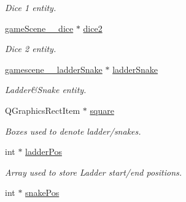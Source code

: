 \begin{DoxyCompactItemize}
\begin{DoxyCompactList}\small\item\em Dice 1 entity. \end{DoxyCompactList}\item 
\hypertarget{classgameScene__1_aa7c9887f53fd8309078247e57222459e}{\hyperlink{classgameScene__1__dice}{game\-Scene\-\_\-\_\-dice} $\ast$ \hyperlink{classgameScene__1_aa7c9887f53fd8309078247e57222459e}{dice2}}\label{classgameScene__1_aa7c9887f53fd8309078247e57222459e}

\begin{DoxyCompactList}\small\item\em Dice 2 entity. \end{DoxyCompactList}\item 
\hypertarget{classgameScene__1_a54c052f8c73d437ed4912ff28d8671aa}{\hyperlink{classgamescene__1__ladderSnake}{gamescene\-\_\-\_\-ladder\-Snake} $\ast$ \hyperlink{classgameScene__1_a54c052f8c73d437ed4912ff28d8671aa}{ladder\-Snake}}\label{classgameScene__1_a54c052f8c73d437ed4912ff28d8671aa}

\begin{DoxyCompactList}\small\item\em Ladder\&Snake entity. \end{DoxyCompactList}\item 
\hypertarget{classgameScene__1_ad0b58eb08d7dd4e78d550d711034dead}{Q\-Graphics\-Rect\-Item $\ast$ \hyperlink{classgameScene__1_ad0b58eb08d7dd4e78d550d711034dead}{square}}\label{classgameScene__1_ad0b58eb08d7dd4e78d550d711034dead}

\begin{DoxyCompactList}\small\item\em Boxes used to denote ladder/snakes. \end{DoxyCompactList}\item 
\hypertarget{classgameScene__1_ad64789a3e17fdf0d25cc5b19c60d2cdc}{int $\ast$ \hyperlink{classgameScene__1_ad64789a3e17fdf0d25cc5b19c60d2cdc}{ladder\-Pos}}\label{classgameScene__1_ad64789a3e17fdf0d25cc5b19c60d2cdc}

\begin{DoxyCompactList}\small\item\em Array used to store Ladder start/end positions. \end{DoxyCompactList}\item 
\hypertarget{classgameScene__1_a70034731fbabe056dcf29f17d7211fbd}{int $\ast$ \hyperlink{classgameScene__1_a70034731fbabe056dcf29f17d7211fbd}{snake\-Pos}}\label{classgameScene__1_a70034731fbabe056dcf29f17d7211fbd}


\end{DoxyCompactItemize}
